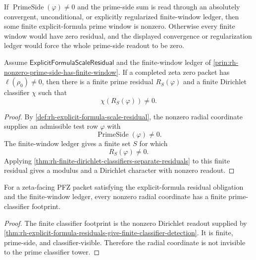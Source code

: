\begin{principle}
\label{prin:rh-nonzero-prime-side-has-finite-window}
If $\operatorname{PrimeSide}(\varphi)\ne0$ and the prime-side sum is
read through an absolutely convergent, unconditional, or explicitly
regularized finite-window ledger, then some finite explicit-formula
prime window is nonzero.  Otherwise every finite window would have zero
residual, and the displayed convergence or regularization ledger would
force the whole prime-side readout to be zero.
\end{principle}

\begin{theorem}
\label{thm:rh-explicit-formula-residuals-give-finite-classifier-detection}
Assume $\mathsf{ExplicitFormulaScaleResidual}$ and the finite-window
ledger of \autoref{prin:rh-nonzero-prime-side-has-finite-window}.  If a
completed zeta zero packet has $\ell(\rho_0)\ne0$, then there is a finite
prime residual $R_S(\varphi)$ and a finite Dirichlet classifier $\chi$
such that
$$
\chi(R_S(\varphi))\ne0.
$$
\end{theorem}

\begin{proof}
By \autoref{def:rh-explicit-formula-scale-residual}, the nonzero radial
coordinate supplies an admissible test row $\varphi$ with
$$
\operatorname{PrimeSide}(\varphi)\ne0.
$$
The finite-window ledger gives a finite set $S$ for which
$$
R_S(\varphi)\ne0.
$$
Applying
\autoref{thm:rh-finite-dirichlet-classifiers-separate-residuals} to this
finite residual gives a modulus and a Dirichlet character with nonzero
readout.
\end{proof}

\begin{corollary}
\label{cor:rh-explicit-formula-supplies-scale-to-classifier-faithfulness}
For a zeta-facing PFZ packet satisfying the explicit-formula residual
obligation and the finite-window ledger, every nonzero radial coordinate
has a finite prime-classifier footprint.
\end{corollary}

\begin{proof}
The finite classifier footprint is the nonzero Dirichlet readout supplied
by
\autoref{thm:rh-explicit-formula-residuals-give-finite-classifier-detection}.
It is finite, prime-side, and classifier-visible.  Therefore the radial
coordinate is not invisible to the prime classifier tower.
\end{proof}
